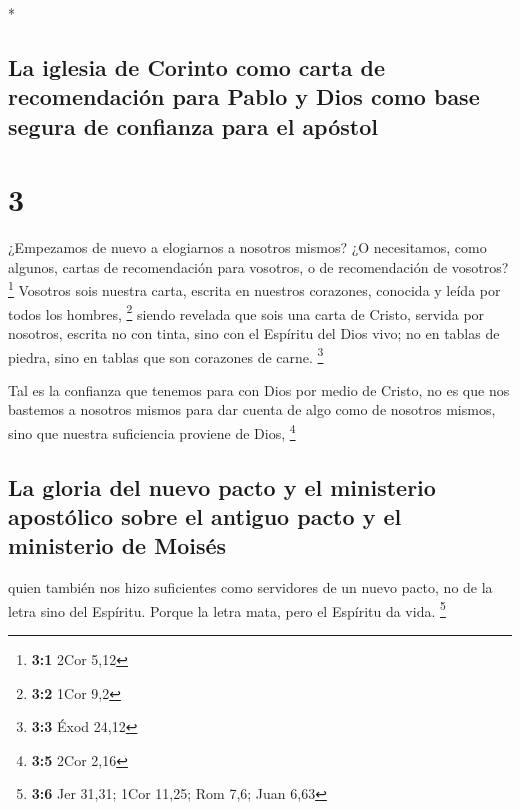 \begin{paracol}{2}
\begin{otherlanguage}{english}
\end{otherlanguage}

\switchcolumn[0]*

\hypertarget{la-iglesia-de-corinto-como-carta-de-recomendaciuxf3n-para-pablo-y-dios-como-base-segura-de-confianza-para-el-apuxf3stol}{%
\subsection{La iglesia de Corinto como carta de recomendación para Pablo
y Dios como base segura de confianza para el
apóstol}\label{la-iglesia-de-corinto-como-carta-de-recomendaciuxf3n-para-pablo-y-dios-como-base-segura-de-confianza-para-el-apuxf3stol}}

\hypertarget{section-4}{%
\section{3}\label{section-4}}

 ¿Empezamos de nuevo a elogiarnos a nosotros mismos? ¿O
necesitamos, como algunos, cartas de recomendación para vosotros, o de
recomendación de vosotros? \footnote{\textbf{3:1} 2Cor 5,12}
 Vosotros sois nuestra carta, escrita en nuestros
corazones, conocida y leída por todos los hombres, \footnote{\textbf{3:2}
  1Cor 9,2}  siendo revelada que sois una carta de Cristo,
servida por nosotros, escrita no con tinta, sino con el Espíritu del
Dios vivo; no en tablas de piedra, sino en tablas que son corazones de
carne. \footnote{\textbf{3:3} Éxod 24,12}

 Tal es la confianza que tenemos para con Dios por medio
de Cristo,  no es que nos bastemos a nosotros mismos para
dar cuenta de algo como de nosotros mismos, sino que nuestra suficiencia
proviene de Dios, \footnote{\textbf{3:5} 2Cor 2,16}

\hypertarget{la-gloria-del-nuevo-pacto-y-el-ministerio-apostuxf3lico-sobre-el-antiguo-pacto-y-el-ministerio-de-moisuxe9s}{%
\subsection{La gloria del nuevo pacto y el ministerio apostólico sobre
el antiguo pacto y el ministerio de
Moisés}\label{la-gloria-del-nuevo-pacto-y-el-ministerio-apostuxf3lico-sobre-el-antiguo-pacto-y-el-ministerio-de-moisuxe9s}}

 quien también nos hizo suficientes como servidores de un
nuevo pacto, no de la letra sino del Espíritu. Porque la letra mata,
pero el Espíritu da vida. \footnote{\textbf{3:6} Jer 31,31; 1Cor 11,25;
  Rom 7,6; Juan 6,63}


\end{paracol}
